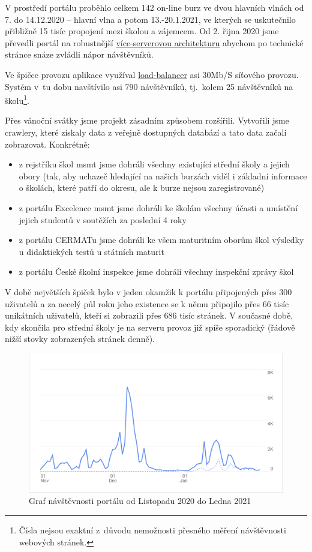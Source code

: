 V prostředí portálu proběhlo celkem 142 on-line burz ve dvou hlavních vlnách od 7. do 14.12.2020 – hlavní vlna a potom 13.-20.1.2021,
ve kterých se uskutečnilo přibližně 15 tisíc propojení mezi školou a zájemcem. 
Od 2. řijna 2020 jsme převedli portál na robustnější \hyperref[sub:multi-server]{více-serverovou architekturu} abychom po technické stránce snáze zvládli nápor návštěvníků. 

Ve špičce provozu aplikace \bso{} využíval \hyperref[sub:load-balancing]{load-balancer} asi 30\si{Mb/S} síťového provozu.
Systém v~tu dobu navštívilo asi 790 návštěvníků, tj.\ kolem 25 návštěvníků na školu\footnote{Čísla nejsou exaktní z~důvodu nemožnosti přesného měření návštěvnosti webových stránek.}.

Přes vánoční svátky jsme projekt zásadním způsobem rozšířili.
Vytvořili jsme crawlery, které získaly data z veřejně dostupných databází a tato data začali zobrazovat. Konkrétně: 

\begin{itemize}
  \item z rejstříku škol \acrshort{msmt} jsme dohráli všechny existující střední školy a jejich obory (tak, aby uchazeč hledající na našich burzách viděl i základní informace o školách, které patří do okresu, ale k burze nejsou zaregistrované)
  \item z portálu Excelence \acrshort{msmt} jsme dohráli ke školám všechny účasti a umístění jejich studentů v soutěžích za poslední 4 roky
  \item z portálu CERMATu jsme dohráli ke všem maturitním oborům škol výsledky u didaktických testů u státních maturit
  \item z portálu České školní inspekce jsme dohráli všechny inspekční zprávy škol
\end{itemize}

V době největších špiček bylo v jeden okamžik k portálu připojených přes 300 uživatelů 
a za necelý půl roku jeho existence se k němu připojilo přes 66 tisíc unikátních uživatelů,
kteří si zobrazili přes 686 tisíc stránek.
V současné době, kdy skončila pro střední školy  je na serveru provoz již spíše sporadický (řádově nižší stovky zobrazených stránek denně). 


\begin{figure}[h]
\centering
\includegraphics[width=\textwidth]{img/listopad-leden-navstevnost.png}
\caption{Graf návštěvnosti portálu \bso{} od Listopadu 2020 do Ledna 2021}\label{fig:navstevnost}
\end{figure}

